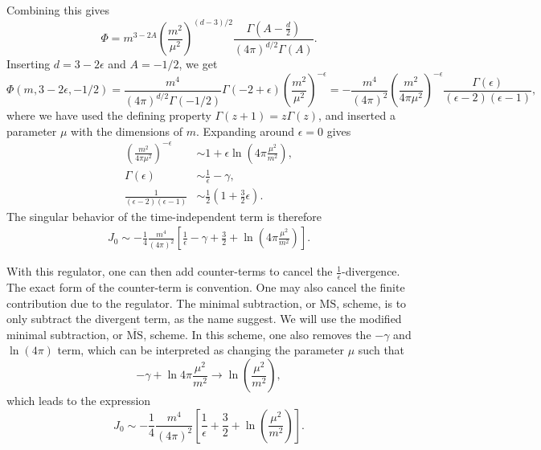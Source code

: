 Combining this gives
\begin{equation}
    \Phi = m^{3 - 2A}
    \left(\frac{m^2}{\mu^2}\right)^{(d-3)/2} 
    \frac{
        \Gamma \left(A - \frac{d}{2} \right) 
    }
    {
        (4 \pi)^{d / 2}\Gamma(A)
    }.
\end{equation}
Inserting $d = 3 - 2\epsilon$ and $A = -1/2$, we get
\begin{equation}
    \Phi(m, 3 - 2\epsilon, -1/2)
    =
    \frac{m^4}{(4 \pi)^{d/2}\Gamma(-1/2)} \Gamma(-2 + \epsilon) \left(\frac{m^2}{\mu^2}\right)^{-\epsilon}
    =
    - \frac{m^4}{(4 \pi)^{2}}
    \left(\frac{m^2}{4 \pi \mu^2}\right)^{- \epsilon}
    \frac{\Gamma(\epsilon)}{(\epsilon - 2)(\epsilon - 1)},
\end{equation}
where we have used the defining property $\Gamma(z + 1) = z\Gamma(z)$, and inserted a parameter $\mu$ with the dimensions of $m$.
Expanding around $\epsilon = 0$ gives
\begin{align}
    \left(\frac{m^2}{4 \pi \mu^2}\right)^{- \epsilon}
    &\sim 1 + \epsilon \ln\left(4 \pi \frac{\mu^2}{m^2}\right),\\
    \Gamma(\epsilon) 
    & \sim \frac{1}{\epsilon} - \gamma, \\
    \frac{1}{(\epsilon - 2)(\epsilon - 1)}
    &\sim \frac{1}{2}\left(1 + \frac{3}{2} \epsilon\right).
\end{align}
The singular behavior of the time-independent term is therefore
\begin{align}
    J_0 \sim
    - \frac{1}{4}\frac{m^4}{(4 \pi)^2}
    \left[
        \frac{1}{\epsilon} 
        - \gamma + \frac{3}{2}
        + \ln\left(4 \pi \frac{\mu^2}{m^2}\right)
    \right].
\end{align}

With this regulator, one can then add counter-terms to cancel the $\frac{1}{\epsilon}$-divergence.
The exact form of the counter-term is convention.
One may also cancel the finite contribution due to the regulator.
The minimal subtraction, or $\mathrm{MS}$, scheme, is to only subtract the divergent term, as the name suggest.
We will use the modified minimal subtraction, or $\overline{ \mathrm{MS}}$, scheme.
In this scheme, one also removes the $-\gamma$ and $\ln(4 \pi)$ term,
which can be interpreted as changing the parameter $\mu$ such that
\begin{equation}
    -\gamma + \ln{4\pi \frac{\mu^2}{m^2}} \rightarrow \ln(\frac{\mu^2}{m^2}),
\end{equation}
which leads to the expression
\begin{equation}
    J_0 \sim
    - \frac{1}{4}\frac{m^4}{(4 \pi)^2}
    \left[
        \frac{1}{\epsilon} 
        + \frac{3}{2}
        + \ln\left(\frac{\mu^2}{m^2}\right)
    \right].
\end{equation}

